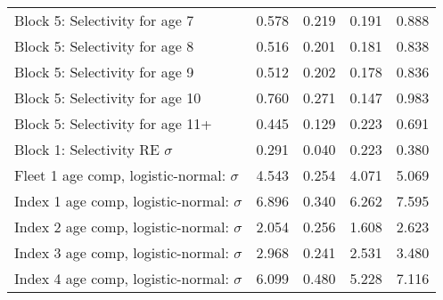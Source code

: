 \documentclass[
]{article}
\begin{document}
\begin{landscape}
\begin{longtable}[t]{lrrrr}
\addlinespace
Block 5: Selectivity for age 7 & 0.578 & 0.219 & 0.191 & 0.888\\
Block 5: Selectivity for age 8 & 0.516 & 0.201 & 0.181 & 0.838\\
Block 5: Selectivity for age 9 & 0.512 & 0.202 & 0.178 & 0.836\\
Block 5: Selectivity for age 10 & 0.760 & 0.271 & 0.147 & 0.983\\
Block 5: Selectivity for age 11+ & 0.445 & 0.129 & 0.223 & 0.691\\
\addlinespace
Block 1: Selectivity RE $\sigma$ & 0.291 & 0.040 & 0.223 & 0.380\\
Fleet 1 age comp, logistic-normal: $\sigma$ & 4.543 & 0.254 & 4.071 & 5.069\\
Index 1 age comp, logistic-normal: $\sigma$ & 6.896 & 0.340 & 6.262 & 7.595\\
Index 2 age comp, logistic-normal: $\sigma$ & 2.054 & 0.256 & 1.608 & 2.623\\
Index 3 age comp, logistic-normal: $\sigma$ & 2.968 & 0.241 & 2.531 & 3.480\\
\addlinespace
Index 4 age comp, logistic-normal: $\sigma$ & 6.099 & 0.480 & 5.228 & 7.116\\*
\end{longtable}
\end{landscape}
\end{document}
